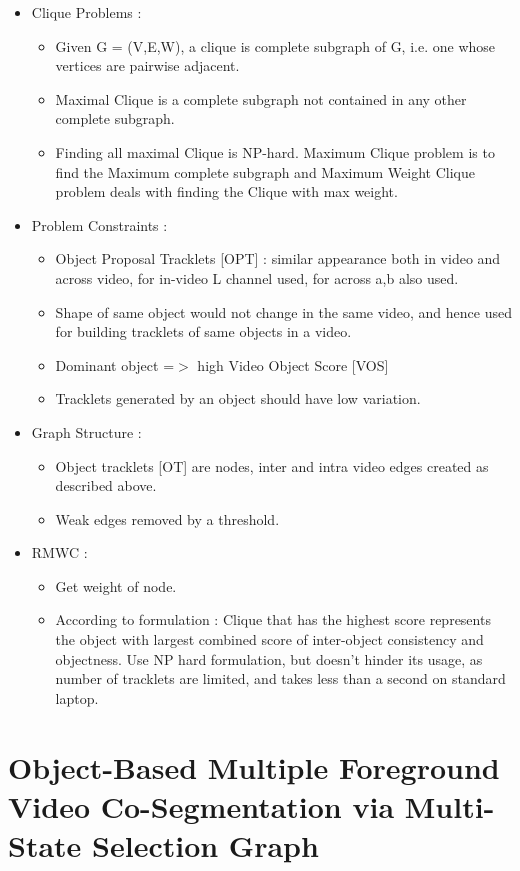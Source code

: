 \documentclass{article}
\begin{document}
\begin{itemize}
\item Clique Problems :
  \begin{itemize}
  \item Given G = (V,E,W), a clique is complete subgraph of G, i.e. one whose vertices are pairwise adjacent.
  \item Maximal Clique is a complete subgraph not contained in any other complete subgraph.
  \item Finding all maximal Clique is NP-hard. Maximum Clique problem is to find the  Maximum complete subgraph and Maximum Weight Clique problem deals with finding the Clique with max weight.
  \end{itemize}
\item Problem Constraints :
  \begin{itemize}
  \item Object Proposal Tracklets [OPT] : similar appearance both in video and across video, for in-video L channel used, for across a,b also used.
  \item Shape of same object would not change in the same video, and hence used for building tracklets of same objects in a video.
  \item Dominant object =$>$ high Video Object Score [VOS]
  \item Tracklets generated by an object should have low variation.
  \end{itemize}
\item Graph Structure :
  \begin{itemize}
  \item Object tracklets [OT] are nodes, inter and intra video edges created as described above.
  \item Weak edges removed by a threshold.
  \end{itemize}
\item RMWC :
  \begin{itemize}
  \item Get weight of node.
  \item According to formulation : Clique that has the highest score represents the object with largest combined score of inter-object consistency and objectness. Use NP hard formulation, but doesn't hinder its usage, as number of tracklets are limited, and takes less than a second on standard laptop.
  \end{itemize}
\end{itemize}

\section{Object-Based Multiple Foreground Video Co-Segmentation via Multi-State Selection Graph}
\cite{7120111}
\end{document}
